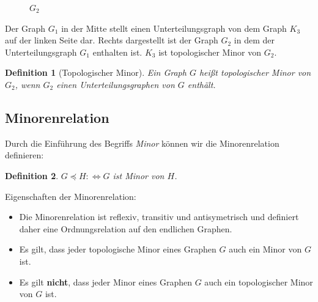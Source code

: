 \documentclass[a4paper]{article}
\newtheorem{definition}{Definition}
\begin{document}
\begin{figure}[H]
\begin{minipage}{.32\linewidth}
  \caption{$G_2$}

\end{minipage}
\end{figure}


Der Graph $G_1$ in der Mitte stellt einen Unterteilungsgraph von dem Graph $K_3$ auf der linken Seite dar. Rechts dargestellt ist der Graph $G_2$ in dem der Unterteilungsgraph $G_1$ enthalten ist. $K_3$ ist topologischer Minor von $G_2$.

\begin{definition}[Topologischer Minor]
Ein Graph $G$ heißt \textit{topologischer Minor} von $G_2$, wenn $G_2$ einen Unterteilungsgraphen von $G$ enthält.
\end{definition}

\newpage

\subsection{Minorenrelation}
Durch die Einführung des Begriffs \textit{Minor} können wir die Minorenrelation definieren:

\begin{definition}
$ G \preccurlyeq H :\Longleftrightarrow G$ ist Minor von $H$.
\end{definition}

Eigenschaften der Minorenrelation:
\begin{itemize}
    \item Die Minorenrelation ist reflexiv, transitiv und antisymetrisch und definiert daher eine Ordnungsrelation auf den endlichen Graphen.
    \item Es gilt, dass jeder topologische Minor eines Graphen $G$ auch ein Minor von $G$ ist.
    \item Es gilt \textbf{nicht}, dass jeder Minor eines Graphen $G$ auch ein topologischer Minor von $G$ ist.
\end{itemize}
\end{document}
